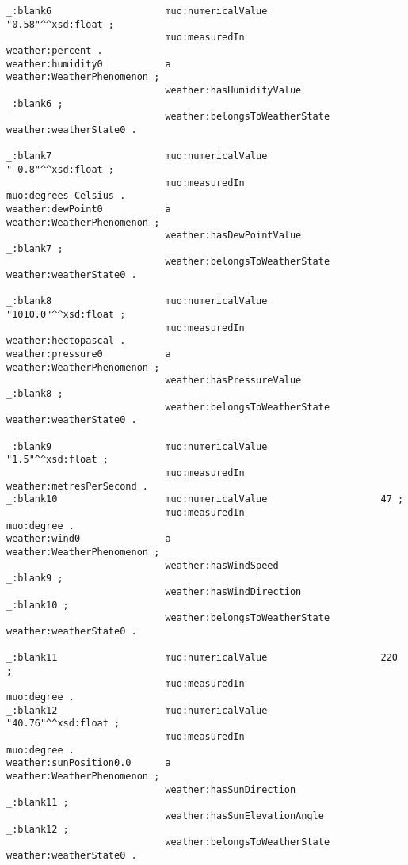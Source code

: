 \begin{lstlisting}
_:blank6                    muo:numericalValue                    "0.58"^^xsd:float ;
                            muo:measuredIn                        weather:percent .
weather:humidity0           a                                     weather:WeatherPhenomenon ;
                            weather:hasHumidityValue              _:blank6 ;
                            weather:belongsToWeatherState         weather:weatherState0 .

_:blank7                    muo:numericalValue                    "-0.8"^^xsd:float ;
                            muo:measuredIn                        muo:degrees-Celsius .
weather:dewPoint0           a                                     weather:WeatherPhenomenon ;
                            weather:hasDewPointValue              _:blank7 ;
                            weather:belongsToWeatherState         weather:weatherState0 .

_:blank8                    muo:numericalValue                    "1010.0"^^xsd:float ;
                            muo:measuredIn                        weather:hectopascal .
weather:pressure0           a                                     weather:WeatherPhenomenon ;
                            weather:hasPressureValue              _:blank8 ;
                            weather:belongsToWeatherState         weather:weatherState0 .

_:blank9                    muo:numericalValue                    "1.5"^^xsd:float ;
                            muo:measuredIn                        weather:metresPerSecond .
_:blank10                   muo:numericalValue                    47 ;
                            muo:measuredIn                        muo:degree .
weather:wind0               a                                     weather:WeatherPhenomenon ;
                            weather:hasWindSpeed                  _:blank9 ;
                            weather:hasWindDirection              _:blank10 ;
                            weather:belongsToWeatherState         weather:weatherState0 .

_:blank11                   muo:numericalValue                    220 ;
                            muo:measuredIn                        muo:degree .
_:blank12                   muo:numericalValue                    "40.76"^^xsd:float ;
                            muo:measuredIn                        muo:degree .
weather:sunPosition0.0      a                                     weather:WeatherPhenomenon ;
                            weather:hasSunDirection               _:blank11 ;
                            weather:hasSunElevationAngle          _:blank12 ;
                            weather:belongsToWeatherState         weather:weatherState0 .


\end{lstlisting}
